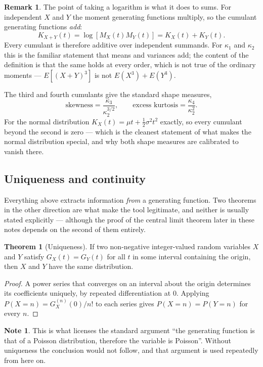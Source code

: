 \documentclass[11pt,a4paper]{article}
\theoremstyle{definition}
\newtheorem{thm}{Theorem}[subsection]
\newtheorem*{note}{Note}
\newtheorem*{remark}{Remark}
\begin{document}
\begin{remark}
The point of taking a logarithm is what it does to sums. For independent $X$ and
$Y$ the moment generating functions multiply, so the cumulant generating
functions \emph{add}:
$$K_{X+Y}(t) = \log\left[M_X(t)M_Y(t)\right] = K_X(t) + K_Y(t).$$
Every cumulant is therefore additive over independent summands. For $\kappa_1$
and $\kappa_2$ this is the familiar statement that means and variances add; the
content of the definition is that the same holds at every order, which is not
true of the ordinary moments --- $E\left[(X+Y)^{3}\right]$ is not
$E\left(X^{3}\right)+E\left(Y^{3}\right)$.

The third and fourth cumulants give the standard shape measures,
$$\text{skewness} = \frac{\kappa_3}{\kappa_2^{3/2}},\qquad
\text{excess kurtosis} = \frac{\kappa_4}{\kappa_2^{2}} .$$
For the normal distribution $K_X(t)=\mu t + \frac12\sigma^{2}t^{2}$ exactly, so
every cumulant beyond the second is zero --- which is the cleanest statement of
what makes the normal distribution special, and why both shape measures are
calibrated to vanish there.
\end{remark}

\subsection{Uniqueness and continuity}

Everything above extracts information \emph{from} a generating function. Two
theorems in the other direction are what make the tool legitimate, and neither
is usually stated explicitly --- although the proof of the central limit theorem
later in these notes depends on the second of them entirely.

\begin{thm}[Uniqueness]
If two non-negative integer-valued random variables $X$ and $Y$ satisfy
$G_X(t) = G_Y(t)$ for all $t$ in some interval containing the origin, then $X$
and $Y$ have the same distribution.
\end{thm}

\begin{proof}
A power series that converges on an interval about the origin determines its
coefficients uniquely, by repeated differentiation at $0$. Applying
$P(X=n) = G_X^{(n)}(0)/n!$ to each series gives $P(X=n)=P(Y=n)$ for every $n$.
\end{proof}

\begin{note}
This is what licenses the standard argument ``the generating function is that of
a Poisson distribution, therefore the variable is Poisson''. Without uniqueness
the conclusion would not follow, and that argument is used repeatedly from here
on.
\end{note}
\end{document}
